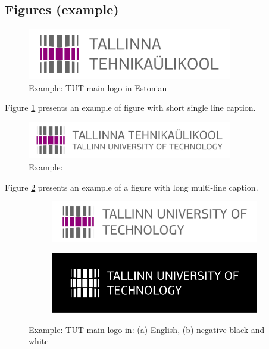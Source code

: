 \subsection{Figures (example)}


\begin{figure}[!ht]
  \centering
  \includegraphics[width=0.8\textwidth]{figures/TTU_peamine_logo_EST_print}
  \caption{ Example: TUT main logo in Estonian}
  \label{fig:logo}
\end{figure}

Figure \ref{fig:logo} presents an example of figure with short single
line caption.

\begin{figure}[!ht]
  \centering
  \includegraphics[width=0.8\textwidth]{figures/TTU_alternatiivne_logo_EST_ENG_print}
  \caption{Example: \blindtext} %
  \label{fig:logo2}
\end{figure}

Figure \ref{fig:logo2} presents an example of a figure with long multi-line caption.


\begin{figure}[!ht]
  \centering
  \begin{subfigure}[b]{0.45\textwidth}
    \includegraphics[width=\textwidth]{figures/TTU_peamine_logo_ENG_print}
    \caption{}
  \end{subfigure}
  \qquad
  \begin{subfigure}[b]{0.45\textwidth}
    \includegraphics[width=\textwidth]{figures/ttu_peamine_logo_eng_must-valge_negatiivis}
    \caption{}
  \end{subfigure}
  \caption{Example: TUT main logo in: (a) English, (b) negative black and white}
  \label{fig:logo3}
\end{figure}


